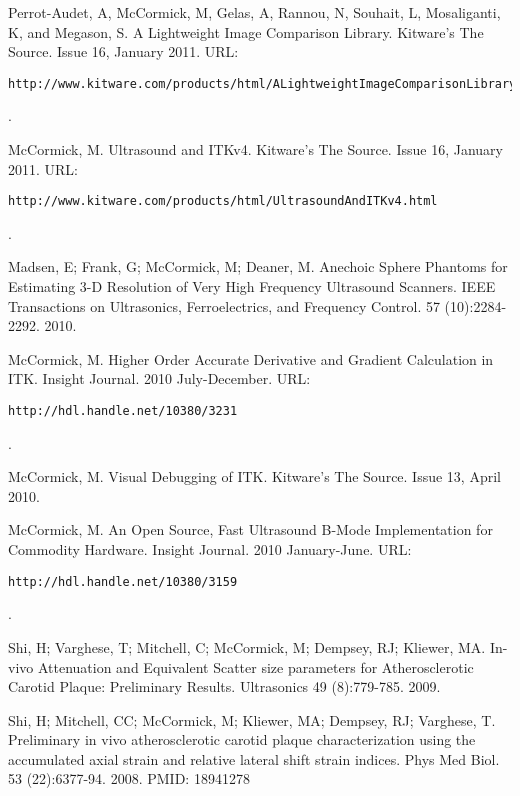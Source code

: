 \documentclass[margin,line]{res}
\begin{document}
\begin{resume}
Perrot-Audet, A, McCormick, M, Gelas, A, Rannou, N, Souhait, L, Mosaliganti, K,
and Megason, S.  A Lightweight Image Comparison Library.  Kitware's The Source.
Issue 16, January 2011.
\vspace*{-.25in}
URL: \begin{verbatim}http://www.kitware.com/products/html/ALightweightImageComparisonLibrary.html\end{verbatim}.
\vspace*{-.35in}

McCormick, M.  Ultrasound and ITKv4.  Kitware's The Source.  Issue 16, January
2011.
\vspace*{-.25in}
URL: \begin{verbatim}http://www.kitware.com/products/html/UltrasoundAndITKv4.html\end{verbatim}.
\vspace*{-.35in}

Madsen, E; Frank, G; McCormick, M; Deaner, M.  Anechoic Sphere Phantoms for
Estimating 3-D Resolution of Very High Frequency Ultrasound Scanners.
IEEE Transactions on Ultrasonics, Ferroelectrics, and Frequency Control. 57
(10):2284-2292. 2010.

McCormick, M.  Higher Order Accurate Derivative and Gradient Calculation in ITK.
Insight Journal.  2010 July-December.
\vspace*{-.25in}
URL: \begin{verbatim}http://hdl.handle.net/10380/3231\end{verbatim}.
\vspace*{-.35in}

McCormick, M.  Visual Debugging of ITK.  Kitware's The Source.  Issue 13, April
2010.

McCormick, M.  An Open Source, Fast Ultrasound B-Mode Implementation for
Commodity Hardware.  Insight Journal.  2010 January-June.
\vspace*{-.25in}
URL: \begin{verbatim}http://hdl.handle.net/10380/3159\end{verbatim}.
\vspace*{-.35in}

Shi, H; Varghese, T; Mitchell, C; McCormick, M; Dempsey, RJ; Kliewer, MA.
In-vivo Attenuation and Equivalent Scatter size parameters for Atherosclerotic
Carotid Plaque: Preliminary Results.  Ultrasonics 49 (8):779-785.  2009.

Shi, H; Mitchell, CC; McCormick, M; Kliewer, MA; Dempsey, RJ; Varghese, T.
Preliminary in vivo atherosclerotic carotid plaque characterization
using the accumulated axial strain and relative lateral shift strain
indices.  Phys Med Biol. 53 (22):6377-94. 2008. PMID:
18941278


\end{resume}
\end{document}

